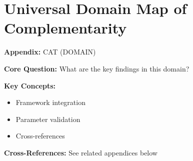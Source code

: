 %
%
%

\chapter{Universal Domain Map of Complementarity}
\label{app:domain-catalog}


\begin{tcolorbox}[colback=blue!5!white, colframe=blue!75!black,
    title=Quick Reference: Appendix UNMAPPED_CAT]

\textbf{Appendix:} CAT (DOMAIN)

\textbf{Core Question:} What are the key findings in this domain?

\textbf{Key Concepts:}
\begin{itemize}[nosep]
\item Framework integration
\item Parameter validation
\item Cross-references
\end{itemize}

\textbf{Cross-References:} See related appendices below
\end{tcolorbox}

\begin{abstract}
Complementarity ($\gamma$) is a universal mathematical concept that manifests across
virtually all scientific disciplines. This appendix provides a comprehensive catalog
of 20+ domains where complementarity theory applies, organized into four clusters:
\textbf{Social Sciences} (Economics, Psychology, Management, Sociology, Political Science),
\textbf{Natural Sciences} (Physics, Chemistry, Biology, Ecology),
\textbf{Life Sciences} (Neuroscience, Medicine, Pharmacology, Nutrition),
and \textbf{Formal/Applied Sciences} (Computer Science, Engineering, Mathematics).
For each domain, we document the $\gamma$-interpretation, key researchers, measurement
approaches, empirical ranges, and connections to the EBF framework.
\end{abstract}

